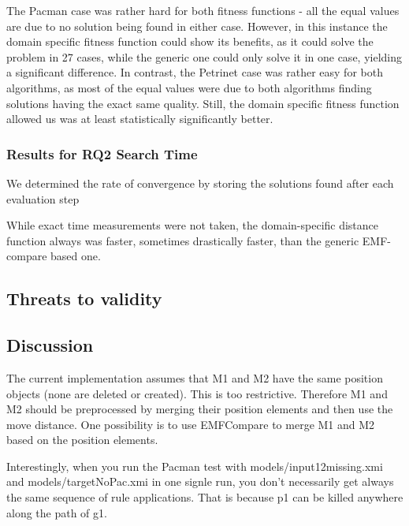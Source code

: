 The Pacman case was rather hard for both fitness functions - all the equal values are due to no solution being found in either case. However, in this instance the domain specific fitness function could show its benefits, as it could solve the problem in 27 cases, while the generic one could only solve it in one case, yielding a significant difference. In contrast, the Petrinet case was rather easy for both algorithms, as most of the equal values were due to both algorithms finding solutions having the exact same quality. Still, the domain specific fitness function allowed us was at least statistically significantly better.


\subsubsection{Results for RQ2 Search Time}

We determined the rate of convergence by storing the solutions found after each evaluation step





While exact time measurements were not taken, the domain-specific distance function always was faster, sometimes drastically faster,
than the generic EMF-compare based one. 


\subsection{Threats to validity}

\subsection{Discussion}
The current implementation assumes that M1 and M2 have the same position objects (none are deleted or created). This is too restrictive. Therefore M1 and M2 should be preprocessed by merging their position elements and then use the move distance. One possibility is to use EMFCompare to merge M1 and M2 based on the position elements.

Interestingly, when you run the Pacman test with models/input12missing.xmi and models/targetNoPac.xmi in one signle run, you don't necessarily get always the same sequence of rule applications. That is because p1 can be killed anywhere along the path of g1. 